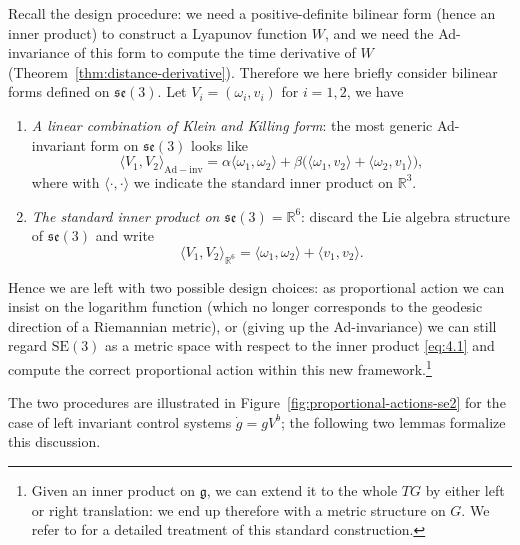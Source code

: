 \documentclass[11pt]{article}
\newcommand{\SE}{\mathrm{SE}}
\newcommand{\se}{\mathfrak{se}}
\newcommand{\gfrak}{\mathfrak g}
\newcommand{\R}{\mathbb R}
\begin{document}
Recall the design procedure: we need a positive-definite bilinear form (hence an inner product) to construct a Lyapunov function $W$, and we need the Ad-invariance of this form to compute the time derivative of $W$ (Theorem~\ref{thm:distance-derivative}). Therefore we here briefly consider bilinear forms defined on $\se(3)$. Let $V_i=(\omega_i,v_i)$ for $i=1,2$, we have
\begin{enumerate}[label=\arabic*.]
\item \emph{A linear combination of Klein and Killing form}: the most generic Ad-invariant form on $\se(3)$ looks like
\begin{equation*}
\langle V_1,V_2\rangle_{\mathrm{Ad-inv}}=\alpha\langle\omega_1,\omega_2\rangle+\beta\bigl(\langle\omega_1,v_2\rangle+\langle\omega_2,v_1\rangle\bigr),
\end{equation*}
where with $\langle\cdot,\cdot\rangle$ we indicate the standard inner product on $\R^3$.
\item \emph{The standard inner product on $\se(3)=\R^6$}: discard the Lie algebra structure of $\se(3)$ and write
\begin{equation*}
\langle V_1,V_2\rangle_{\R^6}=\langle\omega_1,\omega_2\rangle+\langle v_1,v_2\rangle.\tag{4.1}\label{eq:4.1}
\end{equation*}
\end{enumerate}
Hence we are left with two possible design choices: as proportional action we can insist on the logarithm function (which no longer corresponds to the geodesic direction of a Riemannian metric), or (giving up the Ad-invariance) we can still regard $\SE(3)$ as a metric space with respect to the inner product \eqref{eq:4.1} and compute the correct proportional action within this new framework.\footnote{Given an inner product on $\gfrak$, we can extend it to the whole $TG$ by either left or right translation: we end up therefore with a metric structure on $G$. We refer to \cite{4} for a detailed treatment of this standard construction.}

The two procedures are illustrated in Figure~\ref{fig:proportional-actions-se2} for the case of left invariant control systems $\dot g=gV^b$; the following two lemmas formalize this discussion.
\end{document}
